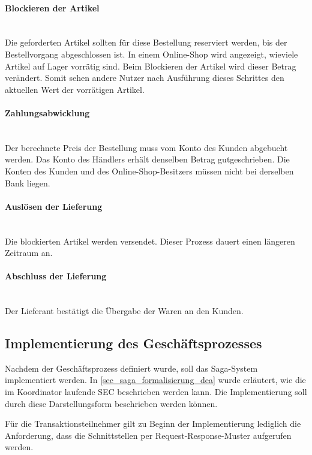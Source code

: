 \paragraph*{Blockieren der Artikel} \mbox{}\\
Die geforderten Artikel sollten für diese Bestellung reserviert werden, bis der Bestellvorgang abgeschlossen ist. In einem Online-Shop wird angezeigt, wieviele Artikel auf Lager vorrätig sind. Beim Blockieren der Artikel wird dieser Betrag verändert. Somit sehen andere Nutzer nach Ausführung dieses Schrittes den aktuellen Wert der vorrätigen Artikel. 

\paragraph*{Zahlungsabwicklung} \mbox{}\\
Der berechnete Preis der Bestellung muss vom Konto des Kunden abgebucht werden. Das Konto des Händlers erhält denselben Betrag gutgeschrieben. Die Konten des Kunden und des Online-Shop-Besitzers müssen nicht bei derselben Bank liegen. 

\paragraph*{Auslösen der Lieferung} \mbox{}\\
Die blockierten Artikel werden versendet. Dieser Prozess dauert einen längeren Zeitraum an.

\paragraph*{Abschluss der Lieferung} \mbox{}\\
Der Lieferant bestätigt die Übergabe der Waren an den Kunden.


\subsection{Implementierung des Geschäftsprozesses}
Nachdem der Geschäftsprozess definiert wurde, soll das Saga-System implementiert werden. In \ref{sec_saga_formalisierung_dea} wurde erläutert, wie die im Koordinator laufende SEC beschrieben werden kann. Die Implementierung soll durch diese Darstellungsform beschrieben werden können.

Für die Transaktionsteilnehmer gilt zu Beginn der Implementierung lediglich die Anforderung, dass die Schnittstellen per Request-Response-Muster aufgerufen werden. 

